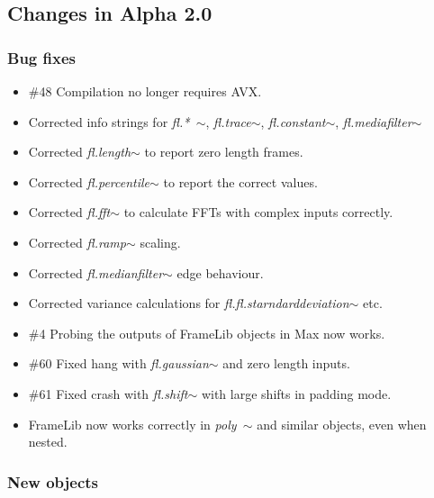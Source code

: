 \documentclass{article}
\newcommand{\object}[1]{\textit{#1$\sim$}}
\newcommand{\flobject}[1]{\textit{fl.#1$\sim$}}
\begin{document}
\subsection{Changes in Alpha 2.0}
\vspace{0.1in}

\subsubsection{Bug fixes}

\begin{itemize}
\item {\#48} Compilation no longer requires AVX.
\item Corrected info strings for \flobject{*~},  \flobject{trace},  \flobject{constant},  \flobject{mediafilter}
\item Corrected \flobject{length} to report zero length frames.
\item Corrected \flobject{percentile} to report the correct values.
\item Corrected \flobject{fft} to calculate FFTs with complex inputs correctly.
\item Corrected \flobject{ramp} scaling.
\item Corrected \flobject{medianfilter} edge behaviour.
\item Corrected variance calculations for  \flobject{fl.starndarddeviation} etc.
\item {\#4} Probing the outputs of FrameLib objects in Max now works.
\item {\#60} Fixed hang with \flobject{gaussian} and zero length inputs.
\item  {\#61} Fixed crash with \flobject{shift} with large shifts in padding mode.
\item FrameLib now works correctly in \object{poly~} and similar objects, even when nested.
\end{itemize}

\subsubsection{New objects}
\end{document}
